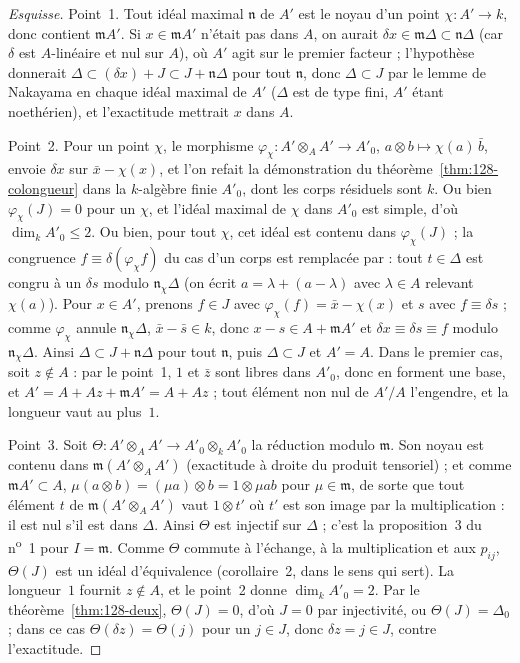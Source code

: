 \begin{proof}[Esquisse]
Point~1. Tout idéal maximal $\mathfrak n$ de $A'$ est le noyau d'un point $\chi : A' \to k$, donc contient $\mathfrak m A'$. Si $x \in \mathfrak m A'$ n'était pas dans $A$, on aurait $\delta x \in \mathfrak m \Delta \subset \mathfrak n \Delta$ (car $\delta$ est $A$-linéaire et nul sur $A$), où $A'$ agit sur le premier facteur ; l'hypothèse donnerait $\Delta \subset (\delta x) + J \subset J + \mathfrak n \Delta$ pour tout $\mathfrak n$, donc $\Delta \subset J$ par le lemme de Nakayama en chaque idéal maximal de $A'$ ($\Delta$ est de type fini, $A'$ étant noethérien), et l'exactitude mettrait $x$ dans $A$.

Point~2. Pour un point $\chi$, le morphisme $\varphi_\chi : A' \otimes_A A' \to A'_0$, $a \otimes b \mapsto \chi(a)\, \bar b$, envoie $\delta x$ sur $\bar x - \chi(x)$, et l'on refait la démonstration du théorème~\ref{thm:128-colongueur} dans la $k$-algèbre finie $A'_0$, dont les corps résiduels sont $k$. Ou bien $\varphi_\chi(J) = 0$ pour un $\chi$, et l'idéal maximal de $\chi$ dans $A'_0$ est simple, d'où $\dim_k A'_0 \leq 2$. Ou bien, pour tout $\chi$, cet idéal est contenu dans $\varphi_\chi(J)$ ; la congruence $f \equiv \delta(\varphi_\chi f)$ du cas d'un corps est remplacée par : tout $t \in \Delta$ est congru à un $\delta s$ modulo $\mathfrak n_\chi \Delta$ (on écrit $a = \lambda + (a - \lambda)$ avec $\lambda \in A$ relevant $\chi(a)$). Pour $x \in A'$, prenons $f \in J$ avec $\varphi_\chi(f) = \bar x - \chi(x)$ et $s$ avec $f \equiv \delta s$ ; comme $\varphi_\chi$ annule $\mathfrak n_\chi \Delta$, $\bar x - \bar s \in k$, donc $x - s \in A + \mathfrak m A'$ et $\delta x \equiv \delta s \equiv f$ modulo $\mathfrak n_\chi \Delta$. Ainsi $\Delta \subset J + \mathfrak n \Delta$ pour tout $\mathfrak n$, puis $\Delta \subset J$ et $A' = A$. Dans le premier cas, soit $z \notin A$ : par le point~1, $1$ et $\bar z$ sont libres dans $A'_0$, donc en forment une base, et $A' = A + Az + \mathfrak m A' = A + Az$ ; tout élément non nul de $A'/A$ l'engendre, et la longueur vaut au plus~$1$.

Point~3. Soit $\Theta : A' \otimes_A A' \to A'_0 \otimes_k A'_0$ la réduction modulo $\mathfrak m$. Son noyau est contenu dans $\mathfrak m (A' \otimes_A A')$ (exactitude à droite du produit tensoriel) ; et comme $\mathfrak m A' \subset A$, $\mu (a \otimes b) = (\mu a) \otimes b = 1 \otimes \mu a b$ pour $\mu \in \mathfrak m$, de sorte que tout élément $t$ de $\mathfrak m(A' \otimes_A A')$ vaut $1 \otimes t'$ où $t'$ est son image par la multiplication : il est nul s'il est dans $\Delta$. Ainsi $\Theta$ est injectif sur $\Delta$ ; c'est la proposition~3 du n\textsuperscript{o}~1 pour $I = \mathfrak m$. Comme $\Theta$ commute à l'échange, à la multiplication et aux $p_{ij}$, $\Theta(J)$ est un idéal d'équivalence (corollaire~2, dans le sens qui sert). La longueur~$1$ fournit $z \notin A$, et le point~2 donne $\dim_k A'_0 = 2$. Par le théorème~\ref{thm:128-deux}, $\Theta(J) = 0$, d'où $J = 0$ par injectivité, ou $\Theta(J) = \Delta_0$ ; dans ce cas $\Theta(\delta z) = \Theta(j)$ pour un $j \in J$, donc $\delta z = j \in J$, contre l'exactitude.
\end{proof}


